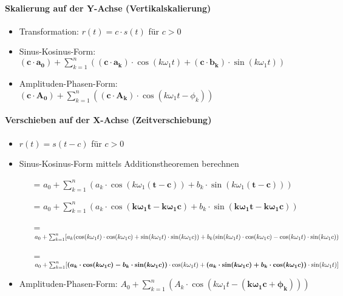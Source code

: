 \paragraph{Skalierung auf der Y-Achse (Vertikalskalierung)}
\begin{itemize}
  \item Transformation: $r(t) = c \cdot s(t)$ für $c > 0$
  \item Sinus-Kosinus-Form: $\boldsymbol{(c \cdot a_0)} + \sum_{k=1}^{n}
  ( \boldsymbol{(c \cdot a_k)} \cdot \cos(k \omega_1 t) + \boldsymbol{(c
  \cdot b_k)} \cdot \sin(k \omega_1 t))$
  \item Amplituden-Phasen-Form: $\boldsymbol{(c \cdot A_0)} + \sum_{k=1}^{n}
    (\boldsymbol{(c \cdot A_k)} \cdot \cos(k \omega_1 t  - \phi_k))$
\end{itemize}
\paragraph{Verschieben auf der X-Achse (Zeitverschiebung)}
\begin{itemize}
  \item $r(t) = s(t-c)$ für $c > 0$
  \item Sinus-Kosinus-Form mittels Additionstheoremen berechnen
    \begin{itemize}
      \item[=] $a_0 + \sum_{k=1}^{n} (a_k \cdot \cos(k \omega_1
        \boldsymbol{(t-c)}) + b_k \cdot \sin(k \omega_1 \boldsymbol{(t-c)}))$
      \item[=] $a_0 + \sum_{k=1}^{n}(
        a_k \cdot \cos(\boldsymbol{k \omega_1 t - k \omega_1 c}) +
        b_k \cdot \sin(\boldsymbol{k \omega_1 t - k \omega_1 c}))$
      \item[=] $a_0 + \sum_{k=1}^{n}[
        a_k (\cos(k \omega_1 t) \cdot \cos(k \omega_1 c) +
          \sin(k \omega_1 t) \cdot \sin(k \omega_1 c)) + \\
        b_k (\sin(k \omega_1 t) \cdot \cos(k \omega_1 c) -
          \cos(k \omega_1 t) \cdot \sin(k \omega_1 c))$
      \item[=] $a_0 + \sum_{k=1}^{n} [
        \boldsymbol{(a_k \cdot \cos(k \omega_1 c) -
        b_k \cdot \sin(k \omega_1 c))} \cdot \cos(k \omega_1 t) + \\
          \boldsymbol{(a_k \cdot \sin(k \omega_1 c) +
        b_k \cdot \cos(k \omega_1 c))} \cdot \sin(k \omega_1 t)]$
    \end{itemize}
  \item Amplituden-Phasen-Form: $A_0 + \sum_{k=1}^{n}
    (A_k \cdot \cos(k \omega_1 t - \boldsymbol{(k \omega_1 c + \phi_k)}))$
\end{itemize}
